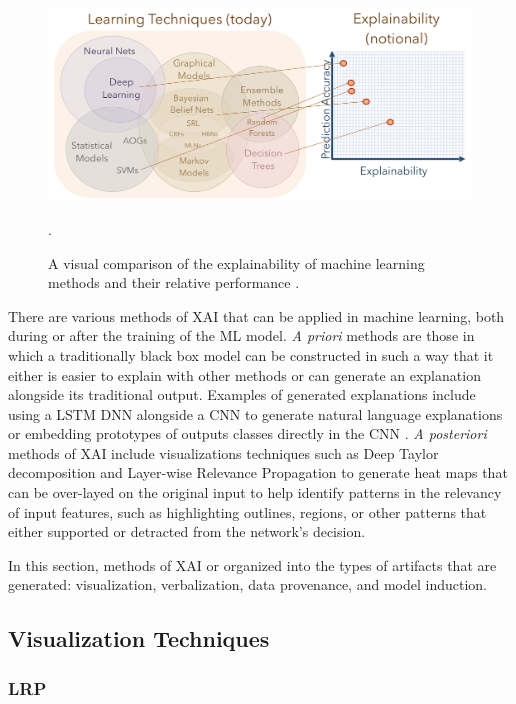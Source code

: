 \begin{figure}
    \includegraphics[width=\textwidth]{media/gunning2016.png}
    \caption{A visual comparison of the explainability of machine learning methods and their relative performance \cite{GunningXAI}.}.
    \label{fig:gunning2016}
\end{figure}

There are various methods of XAI that can be applied in machine learning, both during or after the training of the ML model.  \textit{A priori} methods are those in which a traditionally black box model can be constructed in such a way that it either is easier to explain with other methods or can generate an explanation alongside its traditional output.  Examples of generated explanations include using a LSTM DNN alongside a CNN to generate natural language explanations \cite{10.1007/978-3-319-46493-0_1} or embedding prototypes of outputs classes directly in the CNN \cite{Chen2018}.  \textit{A posteriori} methods of XAI include visualizations techniques such as Deep Taylor decomposition and Layer-wise Relevance Propagation to generate heat maps that can be over-layed on the original input to help identify patterns in the relevancy of input features, such as highlighting outlines, regions, or other patterns that either supported or detracted from the network's decision.

In this section, methods of XAI or organized into the types of artifacts that are generated: visualization, verbalization, data provenance, and model induction.

\subsection{Visualization Techniques}

\subsubsection{LRP}


